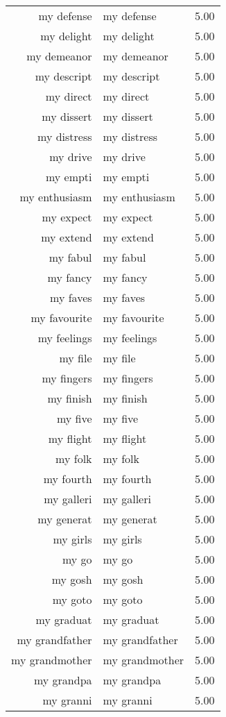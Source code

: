 \begin{table}[ht]
\begin{tabular}{rlr}
  my defense & my defense & 5.00 \\ 
  my delight & my delight & 5.00 \\ 
  my demeanor & my demeanor & 5.00 \\ 
  my descript & my descript & 5.00 \\ 
  my direct & my direct & 5.00 \\ 
  my dissert & my dissert & 5.00 \\ 
  my distress & my distress & 5.00 \\ 
  my drive & my drive & 5.00 \\ 
  my empti & my empti & 5.00 \\ 
  my enthusiasm & my enthusiasm & 5.00 \\ 
  my expect & my expect & 5.00 \\ 
  my extend & my extend & 5.00 \\ 
  my fabul & my fabul & 5.00 \\ 
  my fancy & my fancy & 5.00 \\ 
  my faves & my faves & 5.00 \\ 
  my favourite & my favourite & 5.00 \\ 
  my feelings & my feelings & 5.00 \\ 
  my file & my file & 5.00 \\ 
  my fingers & my fingers & 5.00 \\ 
  my finish & my finish & 5.00 \\ 
  my five & my five & 5.00 \\ 
  my flight & my flight & 5.00 \\ 
  my folk & my folk & 5.00 \\ 
  my fourth & my fourth & 5.00 \\ 
  my galleri & my galleri & 5.00 \\ 
  my generat & my generat & 5.00 \\ 
  my girls & my girls & 5.00 \\ 
  my go & my go & 5.00 \\ 
  my gosh & my gosh & 5.00 \\ 
  my goto & my goto & 5.00 \\ 
  my graduat & my graduat & 5.00 \\ 
  my grandfather & my grandfather & 5.00 \\ 
  my grandmother & my grandmother & 5.00 \\ 
  my grandpa & my grandpa & 5.00 \\ 
  my granni & my granni & 5.00 \\ 

\end{tabular}
\end{table}

